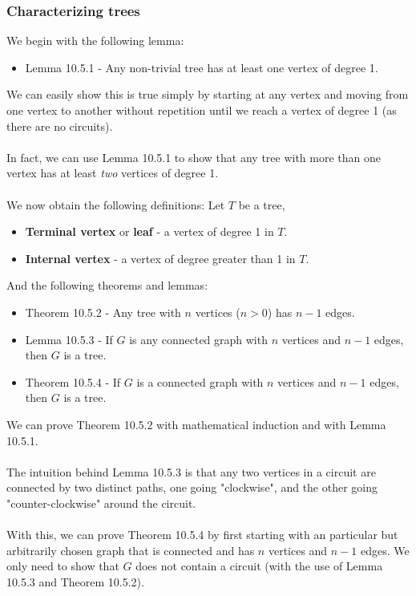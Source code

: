 \documentclass[a4paper]{article}
\begin{document}
\subsubsection{Characterizing trees}
We begin with the following lemma:
\begin{itemize}
	\item[] Lemma 10.5.1 - Any non-trivial tree has at least one vertex of degree 1. 
\end{itemize}
We can easily show this is true simply by starting at any vertex and moving from one vertex to another without repetition until we reach a vertex of degree 1 (as there are no circuits).\\\\
In fact, we can use Lemma 10.5.1 to show that any tree with more than one vertex has at least \textit{two} vertices of degree 1.\\\\
We now obtain the following definitions: Let $T$ be a tree,
\begin{itemize}
	\item[] \textbf{Terminal vertex} or \textbf{leaf} - a vertex of degree 1 in $T$.
	\item[] \textbf{Internal vertex} - a vertex of degree greater than 1 in $T$.
\end{itemize}
And the following theorems and lemmas:
\begin{itemize}
	\item[] Theorem 10.5.2 - Any tree with $n$ vertices ($n>0$) has $n-1$ edges.
	\item[] Lemma 10.5.3 - If $G$ is any connected graph with $n$ vertices and $n-1$ edges, then $G$ is a tree.
	\item[] Theorem 10.5.4 - If $G$ is a connected graph with $n$ vertices and $n-1$ edges, then $G$ is a tree.
\end{itemize}
We can prove Theorem 10.5.2 with mathematical induction and with Lemma 10.5.1.\\\\
The intuition behind Lemma 10.5.3 is that any two vertices in a circuit are connected by two distinct paths, one going "clockwise", and the other going "counter-clockwise" around the circuit.\\\\
With this, we can prove Theorem 10.5.4 by first starting with an particular but arbitrarily chosen graph that is connected and has $n$ vertices and $n-1$ edges. We only need to show that $G$ does not contain a circuit (with the use of Lemma 10.5.3 and Theorem 10.5.2).
\end{document}
